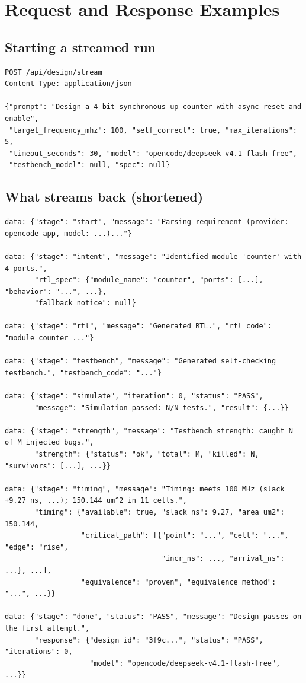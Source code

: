 \chapter{Request and Response Examples}
\label{app:api}

\section{Starting a streamed run}

\begin{lstlisting}[style=plain]
POST /api/design/stream
Content-Type: application/json

{"prompt": "Design a 4-bit synchronous up-counter with async reset and enable",
 "target_frequency_mhz": 100, "self_correct": true, "max_iterations": 5,
 "timeout_seconds": 30, "model": "opencode/deepseek-v4.1-flash-free",
 "testbench_model": null, "spec": null}
\end{lstlisting}

\section{What streams back (shortened)}

\begin{lstlisting}[style=plain]
data: {"stage": "start", "message": "Parsing requirement (provider: opencode-app, model: ...)..."}

data: {"stage": "intent", "message": "Identified module 'counter' with 4 ports.",
       "rtl_spec": {"module_name": "counter", "ports": [...], "behavior": "...", ...},
       "fallback_notice": null}

data: {"stage": "rtl", "message": "Generated RTL.", "rtl_code": "module counter ..."}

data: {"stage": "testbench", "message": "Generated self-checking testbench.", "testbench_code": "..."}

data: {"stage": "simulate", "iteration": 0, "status": "PASS",
       "message": "Simulation passed: N/N tests.", "result": {...}}

data: {"stage": "strength", "message": "Testbench strength: caught N of M injected bugs.",
       "strength": {"status": "ok", "total": M, "killed": N, "survivors": [...], ...}}

data: {"stage": "timing", "message": "Timing: meets 100 MHz (slack +9.27 ns, ...); 150.144 um^2 in 11 cells.",
       "timing": {"available": true, "slack_ns": 9.27, "area_um2": 150.144,
                  "critical_path": [{"point": "...", "cell": "...", "edge": "rise",
                                     "incr_ns": ..., "arrival_ns": ...}, ...],
                  "equivalence": "proven", "equivalence_method": "...", ...}}

data: {"stage": "done", "status": "PASS", "message": "Design passes on the first attempt.",
       "response": {"design_id": "3f9c...", "status": "PASS", "iterations": 0,
                    "model": "opencode/deepseek-v4.1-flash-free", ...}}
\end{lstlisting}

